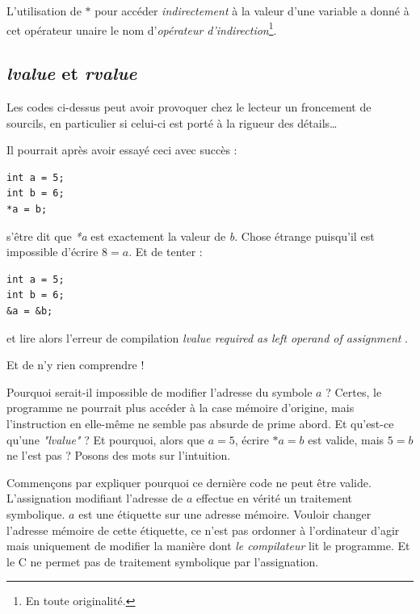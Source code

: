 \documentclass[../../../main.tex]{subfiles}
\begin{document}
\begin{minipage}{\textwidth}
	\begin{center}
		
	\end{center}
\end{minipage}

L'utilisation de $\ast$ pour accéder \textit{indirectement} à la valeur d'une variable a donné à cet opérateur unaire le nom d'\textit{opérateur d'indirection}\footnote{En toute originalité.}.

\subsection{\textit{lvalue} et \textit{rvalue}}
\label{sub:lvalue_et_rvalue}
Les codes ci-dessus peut avoir provoquer chez le lecteur un froncement de sourcils, en particulier si celui-ci est porté à la rigueur des détails\dots

Il pourrait après avoir essayé ceci avec succès :
\begin{verbatim}
int a = 5;
int b = 6;
*a = b;
\end{verbatim}
s'être dit que \textit{*a} est exactement la valeur de \textit{b}. Chose étrange puisqu'il est impossible d'écrire $8 = a$. Et de tenter :
\begin{verbatim}
int a = 5;
int b = 6;
&a = &b;
\end{verbatim}
et lire alors l'erreur de compilation \textit{\og lvalue required as left operand of assignment \fg}.

Et de n'y rien comprendre !

Pourquoi serait-il impossible de modifier l'adresse du symbole $a$ ? Certes, le programme ne pourrait plus accéder à la case mémoire d'origine, mais l'instruction en elle-même ne semble pas absurde de prime abord. Et qu'est-ce qu'une \textit{"lvalue"} ? Et pourquoi, alors que $a = 5$, écrire $*a = b$ est valide, mais $5 = b$ ne l'est pas ?\newline
Posons des mots sur l'intuition.

Commençons par expliquer pourquoi ce dernière code ne peut être valide. L'assignation modifiant l'adresse de $a$ effectue en vérité un traitement symbolique. $a$ est une étiquette sur une adresse mémoire. Vouloir changer l'adresse mémoire de cette étiquette, ce n'est pas ordonner à l'ordinateur d'agir mais uniquement de modifier la manière dont \textit{le compilateur} lit le programme. Et le C ne permet pas de traitement symbolique par l'assignation.
\end{document}
